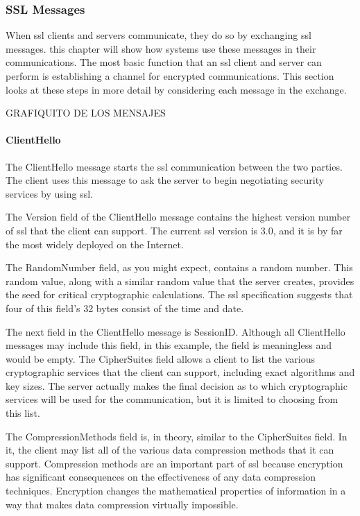 \subsubsection*{SSL Messages}
When ssl clients and servers communicate, they do so by exchanging ssl messages. 
this chapter will show how systems use these messages in their communications.
The most basic function that an ssl client and server can perform is
establishing a channel for encrypted communications. 
This section looks at these steps
in more detail by considering each message in the exchange.


GRAFIQUITO DE LOS MENSAJES 

\paragraph*{ClientHello}
The ClientHello message starts the ssl communication between the
two parties. The client uses this message to ask the server to begin
negotiating security services by using ssl. 

The Version field of the ClientHello message contains the highest
version number of ssl that the client can support. The current ssl
version is 3.0, and it is by far the most widely deployed on the Internet. 

The RandomNumber field, as you might expect, contains a random
number. This random value, along with a similar random value that
the server creates, provides the seed for critical cryptographic calculations.
  The ssl specification suggests that
four of this field’s 32 bytes consist of the time and date. 

The next field in the ClientHello message is SessionID. Although all
ClientHello messages may include this field, in this example, the
field is meaningless and would be empty. 
The CipherSuites field allows a client to list the various cryptographic
services that the client can support, including exact algorithms and
key sizes. The server actually makes the final decision as to which
cryptographic services will be used for the communication, but it is
limited to choosing from this list. 

The CompressionMethods field is, in theory, similar to the CipherSuites field.
 In it, the client may list all of the various data compression methods that 
 it can support. Compression methods are an
important part of ssl because encryption has significant consequences on the 
effectiveness of any data compression techniques. Encryption changes the 
mathematical properties of information in a
way that makes data compression virtually impossible. 

